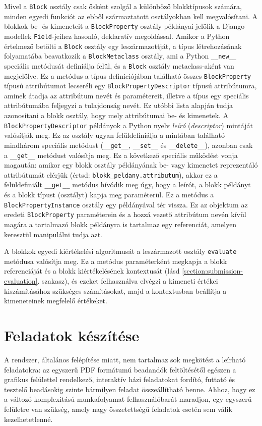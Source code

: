Mivel a \texttt{Block} osztály csak ősként szolgál a különböző blokktípusok számára, minden egyedi funkciót az ebből származtatott osztályokban kell megvalósítani.
A blokkok be- és kimeneteit a \texttt{Block\-Property} osztály példányai jelölik a Django modellek \texttt{Field}-jeihez hasonló, deklaratív megoldással.
Amikor a Python értelmező betölti a \texttt{Block} osztály egy leszármazottját, a típus létrehozásának folyamatába beavatkozik a \texttt{Block\-Metaclass} osztály, ami a Python \texttt{\_\_new\_\_} speciális metódusát definiálja felül, és a \texttt{Block} osztály meta\-class-aként van megjelölve. \cite{PythonMetaclass}
Ez a metódus a típus definiciójában található összes \texttt{Block\-Property} típusú attribútumot lecseréli egy \texttt{Block\-Property\-Descriptor} típusú attribútumra, aminek átadja az attribútum nevét és paramétereit, illetve a típus egy speciális attribútumába feljegyzi a tulajdonság nevét.
Ez utóbbi lista alapján tudja azonosítani a blokk osztály, hogy mely attribútumai be- és kimenetek.
A \texttt{Block\-Property\-Descriptor} példányok a Python nyelv \textit{leíró} (\textit{descriptor}) mintáját valósítják meg.
Ez az osztály ugyan felüldefiniálja a mintában található mindhárom speciális metódust (\texttt{\_\_get\_\_}, \texttt{\_\_set\_\_} és \texttt{\_\_delete\_\_}), azonban csak a \texttt{\_\_get\_\_} metódust valósítja meg.
Ez a következő speciális működést vonja magaután: amikor egy blokk osztály példányának be- vagy kimenetet reprezentáló attribútumát elérjük (értsd: \texttt{blokk\_peldany.attributum}), akkor ez a felüldefiniált \texttt{\_\_get\_\_} metódus hívódik meg úgy, hogy a leírót, a blokk példányt és a blokk típust (osztályt) kapja meg paraméterül. \cite{PythonDescriptors}
Ez a metódus a \texttt{Block\-Property\-Instance} osztály egy példányával tér vissza.
Ez az objektum az eredeti \texttt{Block\-Property} paraméterein és a hozzá vezető attribútum nevén kívül magára a tartalmazó blokk példányra is tartalmaz egy referenciát, amelyen keresztül manipulálni tudja azt.

A blokkok egyedi kiértékelési algoritmusát a leszármazott osztály \texttt{evaluate} metódusa valósítja meg.
Ez a metódus paraméterként megkapja a blokk referenciáját és a blokk kiértékelésének kontextusát (lásd \ref{section:submission-evaluation}. szakasz), és ezeket felhasználva elvégzi a kimeneti értékei kiszámításához szükséges számításokat, majd a kontextusban beállítja a kimeneteinek megfelelő értékeket.

\section{Feladatok készítése}\label{section:exercise-creation}
A rendszer, általános felépítése miatt, nem tartalmaz sok megkötést a leírható feladatokra: az egyszerű PDF formátumú beadandók feltöltésétől egészen a grafikus felülettel rendelkező, interaktív házi feladatokat fordító, futtató és tesztelő beadásokig szinte bármilyen feladat összeállítható benne.
Ahhoz, hogy ez a változó komplexitású munkafolyamat felhasználóbarát maradjon, egy egyszerű felületre van szükség, amely nagy összetettségű feladatok esetén sem válik kezelhetetlenné.

